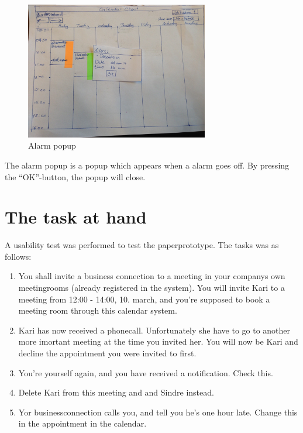 \documentclass{article}
\begin{document}
\begin{figure}[h!] 
    \begin{center} 
        \includegraphics[width=8cm]{img/IMG_5611.JPG}
        \caption{Alarm popup}
    \label{alarm}
    \end{center}
\end{figure}
The alarm popup is a popup which appears when a alarm goes off. By pressing the ``OK''-button, the popup will close.

\newpage

\section{The task at hand}
A usability test was performed to test the paperprototype. The tasks was as follows:
\begin{enumerate}

\item You shall invite a business connection to a meeting in your companys own meetingrooms (already registered in the system). You will invite Kari to a meeting from 12:00 - 14:00, 10. march, and you're supposed to book a meeting room through this calendar system.

\item Kari has now received a phonecall. Unfortunately she have to go to another more imortant meeting at the time you invited her. You will now be Kari and decline the appointment you were invited to first.

\item You're yourself again, and you have received a notification. Check this.

\item Delete Kari from this meeting and and Sindre instead.

\item Yor businessconnection calls you, and tell you he's one hour late. Change this in the appointment in the calendar.
\end{enumerate}
\end{document}
